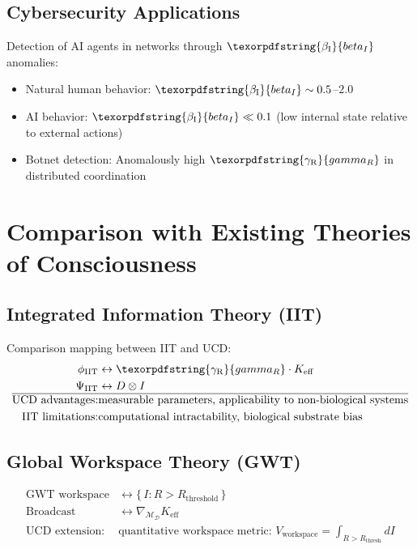 \documentclass[12pt,a4paper]{article}
\DeclareRobustCommand{\beI}{\texorpdfstring{\ensuremath{\beta_{\mathrm{I}}}}{beta_I}}
\DeclareRobustCommand{\gaR}{\texorpdfstring{\ensuremath{\gamma_{\mathrm{R}}}}{gamma_R}}
\newcommand{\Dict}{\mathcal{D}}
\newcommand{\Mdict}{\mathcal{M}_{\Dict}}
\newcommand{\Ke}{K_{\mathrm{eff}}}
\begin{document}
	\subsection{Cybersecurity Applications}
	
	Detection of AI agents in networks through \(\beI\) anomalies:
	\begin{itemize}
		\item Natural human behavior: \(\beI \sim 0.5\)–\(2.0\)
		\item AI behavior: \(\beI \ll 0.1\) (low internal state relative to external actions)
		\item Botnet detection: Anomalously high \(\gaR\) in distributed coordination
	\end{itemize}
	
	\section{Comparison with Existing Theories of Consciousness}
	
	\subsection{Integrated Information Theory (IIT)}
	
	Comparison mapping between IIT and UCD:
	\[
	\begin{aligned}
		\phi_{\mathrm{IIT}} &\leftrightarrow \gaR \cdot \Ke \\
		\Psi_{\mathrm{IIT}} &\leftrightarrow D \otimes I \\
		\hline
		\text{UCD advantages:} & \text{measurable parameters, applicability to non-biological systems} \\
		\text{IIT limitations:} & \text{computational intractability, biological substrate bias}
	\end{aligned}
	\]
	
	\subsection{Global Workspace Theory (GWT)}
	
	\[
	\begin{aligned}
		\text{GWT workspace} &\leftrightarrow \{\,I : R > R_{\mathrm{threshold}}\,\} \\
		\text{Broadcast} &\leftrightarrow \nabla_{\Mdict} \Ke \\
		\hline
		\text{UCD extension:} & \text{quantitative workspace metric: } V_{\mathrm{workspace}} = \int_{R>R_{\mathrm{thresh}}} dI
	\end{aligned}
	\]
	
\end{document}
